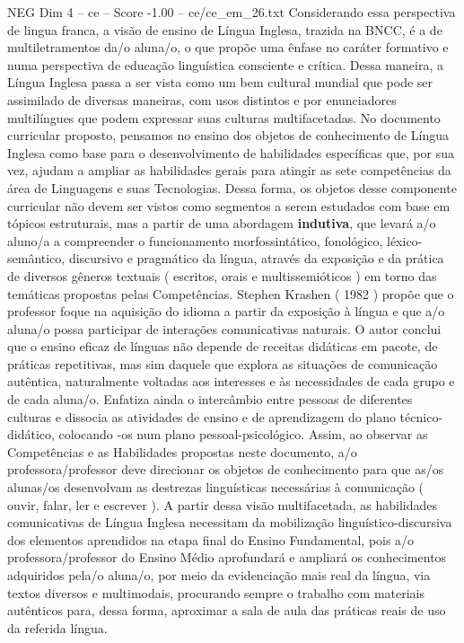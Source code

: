 \begin{textsample}{NEG Dim 4 – ce – Score -1.00 – ce/ce\_em\_26.txt}
Considerando essa perspectiva de lingua franca, a visão de ensino de Língua Inglesa, trazida na BNCC, é a de multiletramentos da/o aluna/o, o que propõe uma ênfase no caráter formativo e numa perspectiva de educação linguística consciente e crítica.
Dessa maneira, a Língua Inglesa passa a ser vista como um bem cultural mundial que pode ser assimilado de diversas maneiras, com usos distintos e por enunciadores multilíngues que podem expressar suas culturas multifacetadas.
No documento curricular proposto, pensamos no ensino dos objetos de conhecimento de Língua Inglesa como base para o desenvolvimento de habilidades específicas que, por sua vez, ajudam a ampliar as habilidades gerais para atingir as sete competências da área de Linguagens e suas Tecnologias.
Dessa forma, os objetos desse componente curricular não devem ser vistos como segmentos a serem estudados com base em tópicos estruturais, mas a partir de uma abordagem \textbf{indutiva}, que levará a/o aluno/a a compreender o funcionamento morfossintático, fonológico, léxico-semântico, discursivo e pragmático da língua, através da exposição e da prática de diversos gêneros textuais ( escritos, orais e multissemióticos ) em torno das temáticas propostas pelas Competências.
Stephen Krashen ( 1982 ) propõe que o professor foque na aquisição do idioma a partir da exposição à língua e que a/o aluna/o possa participar de interações comunicativas naturais.
O autor conclui que o ensino eficaz de línguas não depende de receitas didáticas em pacote, de práticas repetitivas, mas sim daquele que explora as situações de comunicação autêntica, naturalmente voltadas aos interesses e às necessidades de cada grupo e de cada aluna/o.
Enfatiza ainda o intercâmbio entre pessoas de diferentes culturas e dissocia as atividades de ensino e de aprendizagem do plano técnico-didático, colocando -os num plano pessoal-psicológico.
Assim, ao observar as Competências e as Habilidades propostas neste documento, a/o professora/professor deve direcionar os objetos de conhecimento para que as/os alunas/os desenvolvam as destrezas linguísticas necessárias à comunicação ( ouvir, falar, ler e escrever ).
A partir dessa visão multifacetada, as habilidades comunicativas de Língua Inglesa necessitam da mobilização linguístico-discursiva dos elementos aprendidos na etapa final do Ensino Fundamental, pois a/o professora/professor do Ensino Médio aprofundará e ampliará os conhecimentos adquiridos pela/o aluna/o, por meio da evidenciação mais real da língua, via textos diversos e multimodais, procurando sempre o trabalho com materiais autênticos para, dessa forma, aproximar a sala de aula das práticas reais de uso da referida língua.

\end{textsample}
